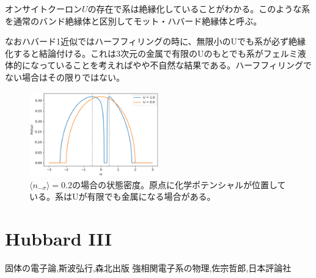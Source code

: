 \documentclass[12pt]{jarticle}
\begin{document}
オンサイトクーロン$U$の存在で系は絶縁化していることがわかる。このような系を通常のバンド絶縁体と区別してモット・ハバード絶縁体と呼ぶ。

なおハバード1近似ではハーフフィリングの時に、無限小のUでも系が必ず絶縁化すると結論付ける。これは3次元の金属で有限のUのもとでも系がフェルミ液体的になっていることを考えればやや不自然な結果である。ハーフフィリングでない場合はその限りではない。
\begin{figure}[h]\label{fig:hubbard1-dos}
  \centering
  \includegraphics[width=0.5\textwidth]{dos_hubbard1_nothalffilling.eps}
  \caption{$\langle n_{-\sigma} \rangle = 0.2$の場合の状態密度。原点に化学ポテンシャルが位置している。系はUが有限でも金属になる場合がある。}
\end{figure}


\section{Hubbard \rm{I}\hspace{-1pt}\rm{I}\hspace{-1pt}\rm{I}}


\begin{thebibliography}{9}
   固体の電子論,斯波弘行,森北出版
  強相関電子系の物理,佐宗哲郎,日本評論社
\end{thebibliography}
\end{document}
